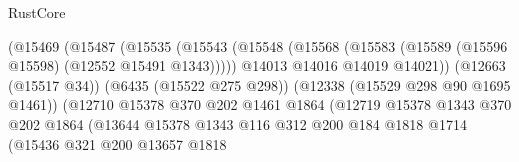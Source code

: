 \begin{lexlean}{RustCore}
\begin{coremodule}
                                            (@15469
                                              (@15487
                                                (@15535
                                                  (@15543
                                                    (@15548
                                                      (@15568
                                                        (@15583
                                                          (@15589
                                                            (@15596 @15598)
                                                            (@12552 @15491 @1343)))))
                                                    @14013
                                                    @14016
                                                    @14019
                                                    @14021))
                                                (@12663 (@15517 @34))
                                                (@6435 (@15522 @275 @298))
                                                (@12338 (@15529 @298 @90 @1695 @1461))
                                                (@12710
                                                  @15378
                                                  @370
                                                  @202
                                                  @1461
                                                  @1864
                                                  (@12719
                                                    @15378
                                                    @1343
                                                    @370
                                                    @202
                                                    @1864
                                                    (@13644
                                                      @15378
                                                      @1343
                                                      @116
                                                      @312
                                                      @200
                                                      @184
                                                      @1818
                                                      @1714
                                                      (@15436
                                                        @321
                                                        @200
                                                        @13657
                                                        @1818

\end{coremodule}
\end{lexlean}
